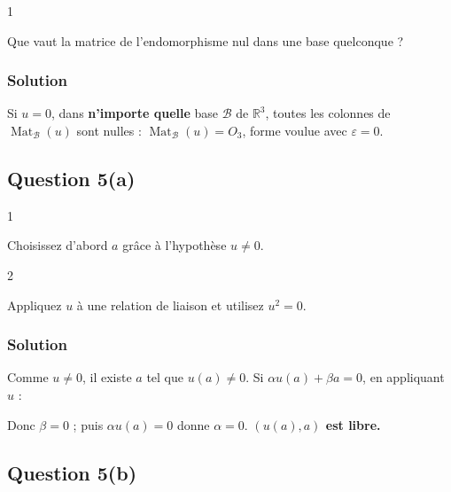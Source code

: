 \documentclass[11pt,a4paper]{article}
\newcommand{\equationajustee}[1]{%
  \sbox{\boiteequation}{$\displaystyle #1$}%
  \ifdim\wd\boiteequation>\linewidth
    \[\resizebox{\linewidth}{!}{\usebox{\boiteequation}}\]%
  \else
    \[#1\]%
  \fi}
\begin{document}
\begin{indication}{1}

Que vaut la matrice de l'endomorphisme nul dans une base quelconque ?

\end{indication}

\hypertarget{solution-29}{%
\subsubsection{Solution}\label{solution-29}}

Si \(u=0\), dans \textbf{n'importe quelle} base \(\mathcal B\) de \(\mathbb R^3\), toutes les colonnes de \(\operatorname{Mat}_{\mathcal B}(u)\) sont nulles : \(\operatorname{Mat}_{\mathcal B}(u)=O_3\), forme voulue avec \textbf{\(\varepsilon=0\)}.

\hypertarget{question-5a-1}{%
\subsection{Question 5(a)}\label{question-5a-1}}

\begin{indication}{1}

Choisissez d'abord \(a\) grâce à l'hypothèse \(u\neq0\).

\end{indication}

\begin{indication}{2}

Appliquez \(u\) à une relation de liaison et utilisez \(u^2=0\).

\end{indication}

\hypertarget{solution-30}{%
\subsubsection{Solution}\label{solution-30}}

Comme \(u\neq0\), il existe \(a\) tel que \(u(a)\neq0\). Si \(\alpha u(a)+\beta a=0\), en appliquant \(u\) :

\equationajustee{\alpha u^2(a)+\beta u(a)=\beta u(a)=0.}

Donc \(\beta=0\) ; puis \(\alpha u(a)=0\) donne \(\alpha=0\). \textbf{\((u(a),a)\) est libre.}

\hypertarget{question-5b-1}{%
\subsection{Question 5(b)}\label{question-5b-1}}
\end{document}
